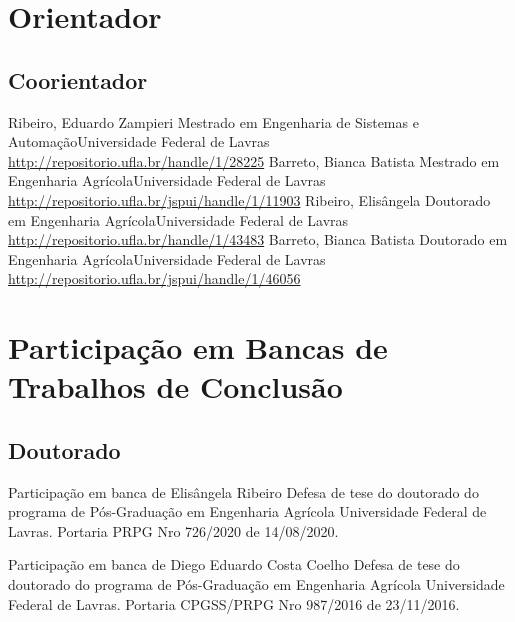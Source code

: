 \documentclass[11pt,a4paper,sans]{moderncv} %
\begin{document}
\section{Orientador}
\subsection{Coorientador}
			{Ribeiro, Eduardo Zampieri}
			{Mestrado em Engenharia de Sistemas e Automação}{Universidade Federal de Lavras}
			{\url{http://repositorio.ufla.br/handle/1/28225}}
			{Barreto, Bianca Batista}
			{Mestrado em Engenharia Agrícola}{Universidade Federal de Lavras}
			{\url{http://repositorio.ufla.br/jspui/handle/1/11903}}
			{Ribeiro, Elisângela }
			{Doutorado em Engenharia Agrícola}{Universidade Federal de Lavras}
			{\url{http://repositorio.ufla.br/handle/1/43483}}
			{Barreto, Bianca Batista}
			{Doutorado em Engenharia Agrícola}{Universidade Federal de Lavras}
			{\url{http://repositorio.ufla.br/jspui/handle/1/46056}}
			
\section{Participação em Bancas de Trabalhos de Conclusão}
\subsection{Doutorado}

			{Participação em banca de Elisângela Ribeiro}
			{Defesa de tese do doutorado do programa de Pós-Graduação em Engenharia Agrícola}{}
			{Universidade Federal de Lavras. Portaria PRPG Nro 726/2020 de 14/08/2020.}

			{Participação em banca de Diego Eduardo Costa Coelho}
			{Defesa de tese do doutorado do programa de Pós-Graduação em Engenharia Agrícola}{}
			{Universidade Federal de Lavras. Portaria CPGSS/PRPG Nro 987/2016 de 23/11/2016.}
\end{document}
